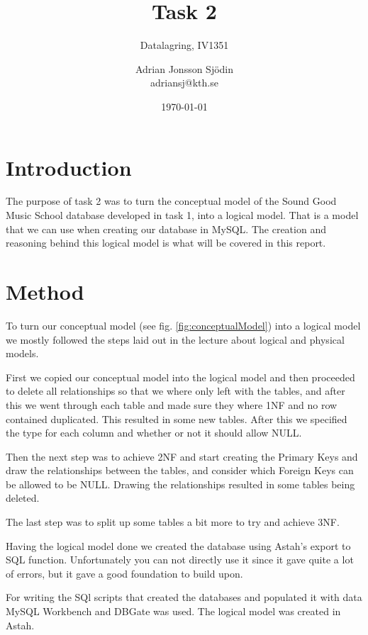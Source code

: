 \documentclass[a4paper]{scrreprt}
\title{Task 2}
\subtitle{Datalagring, IV1351}
\author{Adrian Jonsson Sjödin \\ adriansj@kth.se}
\date{\today}
\begin{document}
\maketitle

\tableofcontents %

\chapter{Introduction}
The purpose of task 2 was to turn the conceptual model of the Sound Good Music School database developed in task 1, into a logical model. That is a model that we can 
use when creating our database in MySQL. The creation and reasoning behind this logical model is what will be covered in this report.

\chapter{Method}
To turn our conceptual model (see fig. \ref{fig:conceptualModel}) into a logical model we mostly followed the steps laid out in the lecture about logical and physical models.

First we copied our conceptual model into the logical model and then proceeded to delete all relationships so that we where only left with the tables, and after this we 
went through each table and made sure they where 1NF and no row contained duplicated. This resulted in some new tables. After this we specified the type for each column 
and whether or not it should allow NULL.

Then the next step was to achieve 2NF and start creating the Primary Keys and draw the relationships between the tables, and consider which Foreign Keys can be allowed 
to be NULL. Drawing the relationships resulted in some tables being deleted.

The last step was to split up some tables a bit more to try and achieve 3NF.

Having the logical model done we created the database using Astah's export to SQL function. Unfortunately you can not directly use it since it gave quite a lot of errors,
but it gave a good foundation to build upon.

For writing the SQl scripts that created the databases and populated it with data MySQL Workbench and DBGate was used. The logical model was created in Astah. 
\end{document}
